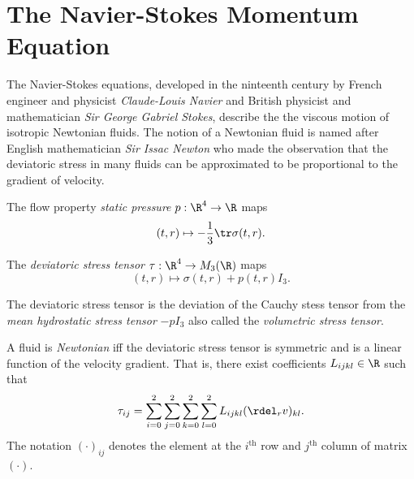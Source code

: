 \section{The Navier-Stokes Momentum Equation}
\begin{rk}
The Navier-Stokes equations, developed in the ninteenth
century by French engineer and physicist \emph{Claude-Louis Navier}
and British physicist and mathematician
\emph{Sir George Gabriel Stokes}, describe the the viscous motion
of isotropic Newtonian fluids.  The notion of a Newtonian fluid is named
after English mathematician \emph{Sir Issac Newton} who made the
observation that the deviatoric stress in many fluids can be approximated
to be proportional to the gradient of velocity.
\end{rk}

\begin{df}
    The flow property \emph{static pressure} $p:\R^4\to \R$ maps
    \begin{equation}
        (t,r)\mapsto -\frac{1}{3} \tr \sigma(t,r).
    \end{equation}
\end{df}

\begin{df}
The \emph{deviatoric stress tensor} $\tau:\R^4\to M_3(\R)$
maps
    \begin{equation}
        (t,r) \mapsto \sigma(t,r) + p(t,r) I_3.
    \end{equation}
\end{df}

\begin{rk}
The deviatoric stress tensor is the deviation of the Cauchy stess tensor
from the \emph{mean hydrostatic stress tensor} $-p I_3$ also called the 
\emph{volumetric stress tensor}.
\end{rk}

\begin{df}
    A fluid is \emph{Newtonian} iff the deviatoric stress tensor is symmetric and
    is a linear function of the velocity gradient.
    That is, there exist coefficients
    $L_{ijkl}\in \R$ such that
    \begin{equation}
        \tau_{ij} = \sum_{i=0}^2 \sum_{j=0}^2 \sum_{k=0}^2 \sum_{l=0}^2 L_{ijkl} (\rdel_r v)_{kl}.
    \end{equation}
    The notation $(\cdot)_{ij}$ denotes the element at the $i^\text{th}$ row and $j^\text{th}$ column of matrix $(\cdot)$.
\end{df}

